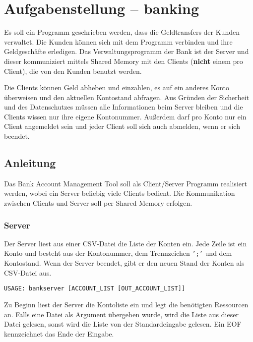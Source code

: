 




\section*{Aufgabenstellung -- banking}

Es soll ein Programm geschrieben werden, dass die Geldtransfers der Kunden
verwaltet. Die Kunden können sich mit dem Programm verbinden und ihre
Geldgeschäfte erledigen. Das Verwaltungsprogramm der Bank ist der Server und
dieser kommuniziert mittels Shared Memory mit den Clients (\textbf{nicht} einem
pro Client), die von den Kunden benutzt werden.

Die Clients können Geld abheben und einzahlen, es auf ein anderes Konto
überweisen und den aktuellen Kontostand abfragen. Aus Gründen der Sicherheit
und des Datenschutzes müssen alle Informationen beim Server bleiben und die
Clients wissen nur ihre eigene Kontonummer. Außerdem darf pro Konto nur ein
Client angemeldet sein und jeder Client soll sich auch abmelden, wenn er sich
beendet.



\subsection*{Anleitung}

Das Bank Account Management Tool soll als Client/Server Programm realisiert
werden, wobei ein Server beliebig viele Clients bedient. Die Kommunikation
zwischen Clients und Server soll per Shared Memory erfolgen.


\subsubsection*{Server}
\label{sec:server}

Der Server liest aus einer CSV-Datei die Liste der Konten ein. Jede Zeile ist
ein Konto und besteht aus der Kontonummer, dem Trennzeichen \texttt{';'} und
dem Kontostand. Wenn der Server beendet, gibt er den neuen Stand der Konten als
CSV-Datei aus.

\begin{verbatim}
USAGE: bankserver [ACCOUNT_LIST [OUT_ACCOUNT_LIST]]
\end{verbatim}

Zu Beginn liest der Server die Kontoliste ein und legt die benötigten
Ressourcen an. Falls eine Datei als Argument übergeben wurde, wird die Liste
aus dieser Datei gelesen, sonst wird die Liste von der Standardeingabe gelesen.
Ein EOF kennzeichnet das Ende der Eingabe.

